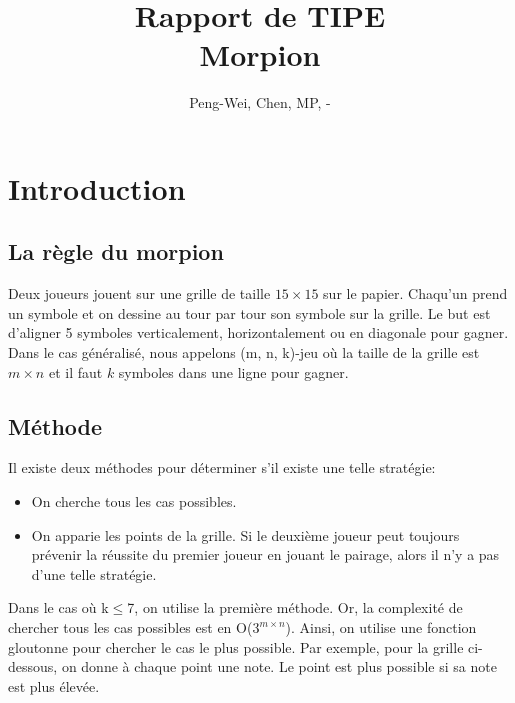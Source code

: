 \documentclass[12pt, a4paper]{article}
\title{Rapport de TIPE\\
Morpion}
\author{Peng-Wei, Chen, MP, \oldstylenums{2017}-\oldstylenums{2018}}
\begin{document}
\maketitle

\section{Introduction}
\subsection*{La règle du morpion}
Deux joueurs jouent sur une grille de taille $15 \times 15$ sur le papier. Chaqu'un prend un symbole et on dessine au tour par tour son symbole sur la grille. Le but est d'aligner 5 symboles verticalement, horizontalement ou en diagonale pour gagner.
Dans le cas généralisé, nous appelons (m, n, k)-jeu où la taille de la grille est $m \times n$ et il faut $k$ symboles dans une ligne pour gagner.
\subsection*{Méthode}
Il existe deux méthodes pour déterminer s'il existe une telle stratégie:
\begin{itemize}
    \item On cherche tous les cas possibles.
    \item On apparie les points de la grille. Si le deuxième joueur peut toujours prévenir la réussite du premier joueur en jouant le pairage, alors il n'y a pas d'une telle stratégie.
\end{itemize}
Dans le cas où k$\le$7, on utilise la première méthode.
Or, la complexité de chercher tous les cas possibles est en O($3^{m \times n}$). Ainsi, on utilise une fonction gloutonne pour chercher le cas le \og plus \fg possible. Par exemple, pour la grille ci-dessous, on donne à chaque point une note. 
Le point est plus possible si sa note est plus élevée.



\end{document}
